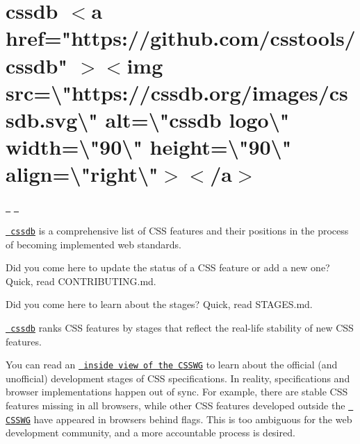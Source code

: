 \chapter{cssdb \texorpdfstring{$<$}{<}a href="{}https\+://github.\+com/csstools/cssdb"{} \texorpdfstring{$>$}{>}\texorpdfstring{$<$}{<}img src=\textbackslash{}"{}https\+://cssdb.\+org/images/cssdb.\+svg\textbackslash{}"{} alt=\textbackslash{}"{}cssdb logo\textbackslash{}"{} width=\textbackslash{}"{}90\textbackslash{}"{} height=\textbackslash{}"{}90\textbackslash{}"{} align=\textbackslash{}"{}right\textbackslash{}"{}\texorpdfstring{$>$}{>}\texorpdfstring{$<$}{<}/a\texorpdfstring{$>$}{>}}
\hypertarget{md_pkiclassroomrescheduler_2src_2main_2frontend_2node__modules_2cssdb_2_r_e_a_d_m_e}{}\label{md_pkiclassroomrescheduler_2src_2main_2frontend_2node__modules_2cssdb_2_r_e_a_d_m_e}
\label{md_pkiclassroomrescheduler_2src_2main_2frontend_2node__modules_2cssdb_2_r_e_a_d_m_e_autotoc_md8077}%
%
 \href{https://www.npmjs.com/package/cssdb}{\texttt{ }} \href{https://github.com/csstools/cssdb/actions/workflows/test.yml}{\texttt{ }}

\href{https://github.com/csstools/cssdb}{\texttt{ cssdb}} is a comprehensive list of CSS features and their positions in the process of becoming implemented web standards.



Did you come here to update the status of a CSS feature or add a new one? Quick, read CONTRIBUTING.md.

Did you come here to learn about the stages? Quick, read STAGES.md.



\href{https://github.com/csstools/cssdb}{\texttt{ cssdb}} ranks CSS features by stages that reflect the real-\/life stability of new CSS features.

You can read an \href{https://fantasai.inkedblade.net/weblog/2011/inside-csswg/process}{\texttt{ inside view of the CSSWG}} to learn about the official (and unofficial) development stages of CSS specifications. In reality, specifications and browser implementations happen out of sync. For example, there are stable CSS features missing in all browsers, while other CSS features developed outside the \href{https://wiki.csswg.org/spec}{\texttt{ CSSWG}} have appeared in browsers behind flags. This is too ambiguous for the web development community, and a more accountable process is desired. 